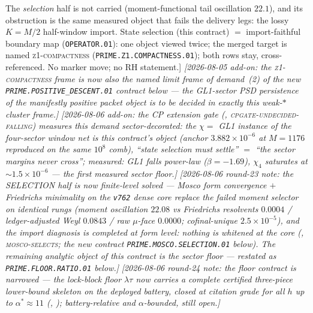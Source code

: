 \documentclass[11pt,a4paper]{article}
\begin{document}
{{The \emph{selection} half is not carried (moment-functional tail
oscillation $22.1$), and its obstruction is the same measured
object that fails the delivery legs: the lossy $K=M/2$ half-window
import.  State selection (this contract) $=$ import-faithful
boundary map (\texttt{OPERATOR.01}): one object viewed twice; the
merged target is named \textsc{z1-compactness}
(\texttt{PRIME.Z1.COMPACTNESS.01}); both rows stay,
cross-referenced.  No marker move; no RH statement.]}
\emph{[2026-08-05 add-on: the \textsc{z1-compactness} frame is now
also the named limit frame of demand~(2) of the new
\texttt{PRIME.POSITIVE\_DESCENT.01} contract below --- the
GL1-sector PSD persistence of the manifestly positive packet
object is to be decided in exactly this weak-$*$ cluster frame.]}
\emph{[2026-08-06 add-on: the CP extension gate
(,
\textsc{cpgate-undecided-falling}) measures this demand
\emph{sector-decorated}: the $\chi=$ GL1 instance of the
four-sector window net \emph{is} this contract's object (anchor
$3.882\times10^{-6}$ at $M=1176$ reproduced on the same $10^8$
comb), ``state selection must settle'' $=$ ``the sector margins
never cross''; measured: GL1 falls power-law ($\beta=-1.69$),
$\chi_4$ saturates at ${\sim}1.5\times10^{-6}$ --- the first
measured sector floor.]}
\emph{[2026-08-06 round-23 note: the SELECTION half is now
finite-level \emph{solved} --- Mosco form convergence $+$
Friedrichs minimality on the \texttt{v762} dense core replace the
failed moment selector on identical rungs (moment oscillation
$22.08$ vs Friedrichs resolvents $0.0004$ / ledger-adjusted Weyl
$0.0843$ / raw $\mu$-face $0.0000$; cofinal-unique
$2.5\times10^{-5}$), and the import diagnosis is completed at form
level: nothing is whitened at the core
(, \textsc{mosco-selects};
the new contract \texttt{PRIME.MOSCO.SELECTION.01} below).  The
remaining analytic object of this contract is the sector floor ---
restated as \texttt{PRIME.FLOOR.RATIO.01} below.]}
\emph{[2026-08-06 round-24 note: the floor contract is
\emph{narrowed} --- the lock-block floor $\lambda\tau$ now carries
a complete certified three-piece lower-bound skeleton on the
deployed battery, closed at citation grade for all $h$ up to
$\alpha^*\approx11$ (,
); battery-relative and
$\alpha$-bounded, still open.]}\par}
\end{document}
